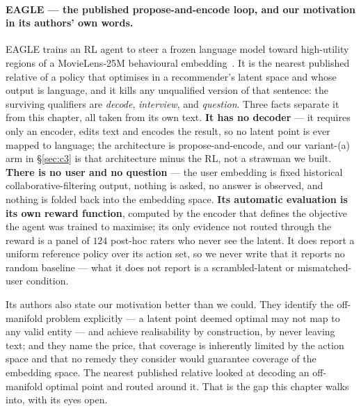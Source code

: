 \documentclass[11pt]{article}
\begin{document}
\paragraph{EAGLE --- the published propose-and-encode loop, and our motivation in its authors' own
words.} EAGLE trains an RL agent to steer a frozen language model toward high-utility regions of a
MovieLens-25M behavioural embedding~\cite{tennenholtz2024eagle}. It is the nearest published relative
of a policy that optimises in a recommender's latent space and whose output is language, and it
kills any unqualified version of that sentence: the surviving qualifiers are \emph{decode},
\emph{interview}, and \emph{question}. Three facts separate it from this chapter, all taken from its
own text. \textbf{It has no decoder} --- it requires only an encoder, edits text and encodes the
result, so no latent point is ever mapped to language; the architecture is propose-and-encode, and
our variant-(a) arm in \S\ref{sec:c3} is that architecture minus the RL, not a strawman we built.
\textbf{There is no user and no question} --- the user embedding is fixed historical
collaborative-filtering output, nothing is asked, no answer is observed, and nothing is folded back
into the embedding space. \textbf{Its automatic evaluation is its own reward function}, computed by
the encoder that defines the objective the agent was trained to maximise; its only evidence not
routed through the reward is a panel of $124$ post-hoc raters who never see the latent. It does
report a uniform reference policy over its action set, so we never write that it reports no random
baseline --- what it does not report is a scrambled-latent or mismatched-user condition.

Its authors also state our motivation better than we could. They identify the off-manifold problem
explicitly --- a latent point deemed optimal may not map to any valid entity --- and achieve
realisability by construction, by never leaving text; and they name the price, that coverage is
inherently limited by the action space and that no remedy they consider would guarantee coverage of
the embedding space. The nearest published relative looked at decoding an off-manifold optimal point
and routed around it. That is the gap this chapter walks into, with its eyes open.
\end{document}
